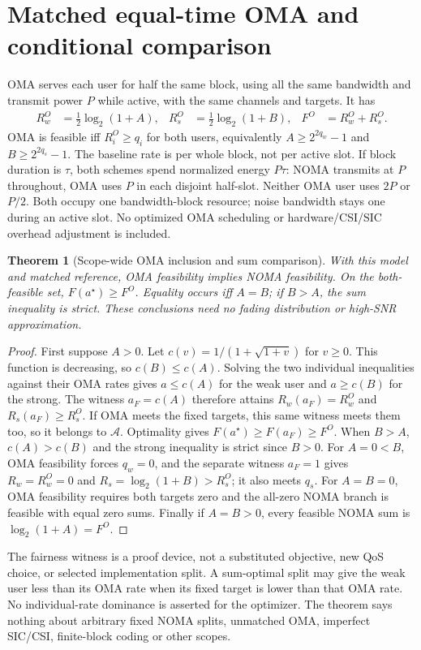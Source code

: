 \documentclass[11pt]{article}
\newtheorem{theorem}{Theorem}
\begin{document}
\section{Matched equal-time OMA and conditional comparison}
OMA serves each user for half the same block, using all the same bandwidth
and transmit power \(P\) while active, with the same channels and targets.
It has
\begin{align}
 R_w^{O}&=\tfrac12\log_2(1+A), &R_s^{O}&=\tfrac12\log_2(1+B), &
 F^O&=R_w^O+R_s^O.
\end{align}
OMA is feasible iff \(R_i^O\geq q_i\) for both users, equivalently
\(A\geq2^{2q_w}-1\) and \(B\geq2^{2q_s}-1\).
The baseline rate is per whole block, not per active slot. If block duration
is \(\tau\), both schemes spend normalized energy \(P\tau\):
NOMA transmits at \(P\) throughout, OMA uses \(P\) in each disjoint
half-slot. Neither OMA user uses \(2P\) or \(P/2\). Both occupy one
bandwidth-block resource; noise bandwidth stays one during an active slot.
No optimized OMA scheduling or hardware/CSI/SIC overhead adjustment is included.

\begin{theorem}[Scope-wide OMA inclusion and sum comparison]
With this model and matched reference, OMA feasibility implies NOMA
feasibility. On the both-feasible set, \(F(a^\star)\geq F^O\).
Equality occurs iff \(A=B\); if \(B>A\), the sum inequality is strict.
These conclusions need no fading distribution or high-SNR approximation.
\end{theorem}
\begin{proof}
First suppose \(A>0\). Let \(c(v)=1/(1+\sqrt{1+v})\) for
\(v\geq0\). This function is decreasing, so \(c(B)\leq c(A)\).
Solving the two individual inequalities against their OMA rates gives
\(a\leq c(A)\) for the weak user and \(a\geq c(B)\) for the strong.
The witness \(a_F=c(A)\) therefore attains
\(R_w(a_F)=R_w^O\) and \(R_s(a_F)\geq R_s^O\).
If OMA meets the fixed targets, this same witness meets them too, so it
belongs to \(\mathcal A\). Optimality gives
\(F(a^\star)\geq F(a_F)\geq F^O\). When \(B>A\),
\(c(A)>c(B)\) and the strong inequality is strict since \(B>0\).
For \(A=0<B\), OMA feasibility forces \(q_w=0\), and the separate
witness \(a_F=1\) gives \(R_w=R_w^O=0\) and
\(R_s=\log_2(1+B)>R_s^O\); it also meets \(q_s\).
For \(A=B=0\), OMA feasibility requires both targets zero and the
all-zero NOMA branch is feasible with equal zero sums. Finally if
\(A=B>0\), every feasible NOMA sum is \(\log_2(1+A)=F^O\).
\end{proof}
The fairness witness is a proof device, not a substituted objective,
new QoS choice, or selected implementation split. A sum-optimal split may
give the weak user less than its OMA rate when its fixed target is lower
than that OMA rate. No individual-rate dominance is asserted for the
optimizer. The theorem says nothing about arbitrary fixed NOMA splits,
unmatched OMA, imperfect SIC/CSI, finite-block coding or other scopes.
\end{document}

